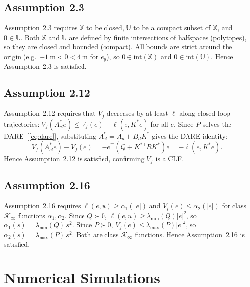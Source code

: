 \documentclass[10pt,twocolumn,twoside]{IEEEtran}
\newcommand{\X}{\mathbb{X}}
\newcommand{\U}{\mathbb{U}}
\begin{document}
\subsection{Assumption 2.3 \cite{rawlings:mayne}}

Assumption~2.3 requires $\X$ to be closed, $\U$ to be a compact subset of
$\X$, and $0 \in \U$.
Both $\X$ and $\U$ are defined by finite intersections of halfspaces
(polytopes), so they are closed and bounded (compact).
All bounds are strict around the origin (e.g.\ $-1\ \mathrm{m} < 0 < 4\ \mathrm{m}$
for $e_y$), so $0 \in \text{int}(\X)$ and $0 \in \text{int}(\U)$.
Hence Assumption~2.3 is satisfied.

\subsection{Assumption 2.12 \cite{rawlings:mayne}}

Assumption~2.12 requires that $V_f$ decreases by at least $\ell$ along
closed-loop trajectories: $V_f(A^*_{cl} e) \leq V_f(e) - \ell(e, K^* e)$
for all $e$.
Since $P$ solves the DARE~[\ref{eq:dare}], substituting $A^*_{cl} = A_d + B_d K^*$
gives the DARE identity:
\begin{equation}
  V_f(A^*_{cl} e) - V_f(e)
  = -e^\top(Q + K^{*\top} R K^*)e
  = -\ell(e, K^* e).
  \label{eq:lyap_decrease}
\end{equation}
Hence Assumption~2.12 is satisfied, confirming $V_f$ is a CLF.

\subsection{Assumption 2.16 \cite{rawlings:mayne}}

Assumption~2.16 requires $\ell(e,u) \geq \alpha_1(|e|)$ and
$V_f(e) \leq \alpha_2(|e|)$ for class $\mathcal{K}_\infty$ functions
$\alpha_1, \alpha_2$.
Since $Q \succ 0$,
$\ell(e,u) \geq \lambda_{\min}(Q)|e|^2$, so $\alpha_1(s) = \lambda_{\min}(Q)\,s^2$.
Since $P \succ 0$,
$V_f(e) \leq \lambda_{\max}(P)|e|^2$, so $\alpha_2(s) = \lambda_{\max}(P)\,s^2$.
Both are class $\mathcal{K}_\infty$ functions.
Hence Assumption~2.16 is satisfied.

\section{Numerical Simulations}
\label{sec:sims}
\end{document}
